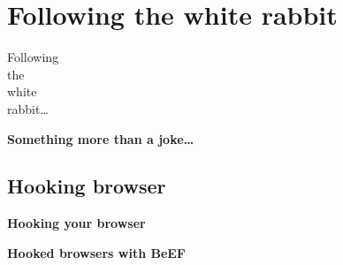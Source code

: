 
\section{Following the white rabbit}

{
\begin{frame}[plain]
    \Huge\bfseries
    \hspace{6.5cm}
    \begin{minipage}{.3\textwidth}
      Following \\
      the \\
      white \\
      rabbit\ldots
    \end{minipage}
\end{frame}
}

\begin{frame}[plain]
  \begin{center}
    \LARGE\bfseries
    Something more than a joke\ldots
  \end{center}

  \vspace{.5cm}

  \begin{center}
  \end{center}
\end{frame}

\subsection{Hooking browser}

\begin{frame}[plain]
    \begin{center}
      \Huge\bfseries
      Hooking your browser
    \end{center}
\end{frame}

\begin{frame}[plain]
  \begin{center}
    \LARGE\bfseries
    Hooked browsers with BeEF
  \end{center}

  \vspace{.5cm}

  \begin{center}
  \end{center}
\end{frame}

